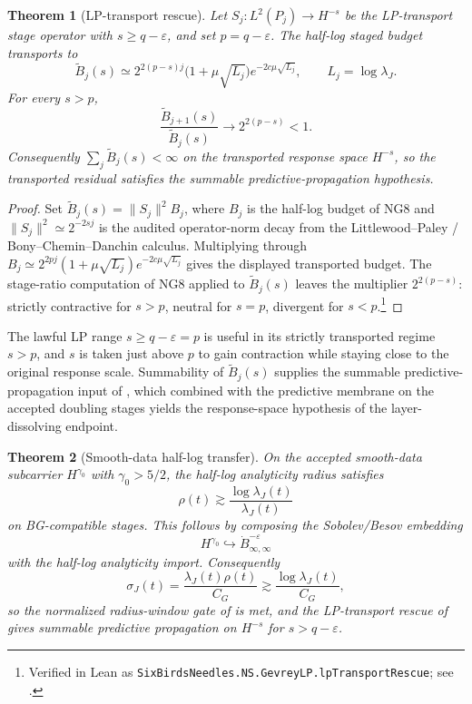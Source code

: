 \documentclass[11pt]{article}
\newcommand{\eps}{\varepsilon}
\newcommand{\CG}{C_G}
\newcommand{\sigmaJ}{\sigma_J}
\newcommand{\lambdaJ}{\lambda_J}
\newcommand{\LPtr}{S_j}
\newtheorem{theorem}{Theorem}[section]
\theoremstyle{definition}
\begin{document}
\begin{theorem}[LP-transport rescue]\label{thm:ns:lp-transport-rescue}
Let \(\LPtr:L^2(P_j)\to H^{-s}\) be the LP-transport stage operator with
\(s\ge q-\eps\), and set \(p=q-\eps\).  The half-log staged budget
transports to
\[
  \widetilde B_j(s)
  \simeq
  2^{2(p-s)j}
  \bigl(1+\mu\sqrt{L_j}\bigr)
  e^{-2c\mu\sqrt{L_j}},
  \qquad
  L_j=\log\lambdaJ .
\]
For every \(s>p\),
\[
  \frac{\widetilde B_{j+1}(s)}{\widetilde B_j(s)}
  \longrightarrow
  2^{2(p-s)}<1 .
\]
Consequently \(\sum_j \widetilde B_j(s)<\infty\) on the transported
response space \(H^{-s}\), so the transported residual satisfies the
summable predictive-propagation hypothesis.
\end{theorem}

\begin{proof}
Set \(\widetilde B_j(s)=\|\LPtr\|^2 B_j\), where \(B_j\) is the
half-log budget of NG8 and \(\|\LPtr\|^2\simeq 2^{-2sj}\) is the
audited operator-norm decay from the Littlewood--Paley /
Bony--Chemin--Danchin calculus.  Multiplying through
\(B_j\simeq 2^{2pj}(1+\mu\sqrt{L_j})e^{-2c\mu\sqrt{L_j}}\) gives the
displayed transported budget.  The stage-ratio computation of NG8
applied to \(\widetilde B_j(s)\) leaves the multiplier
\(2^{2(p-s)}\): strictly contractive for \(s>p\), neutral for
\(s=p\), divergent for \(s<p\).\footnote{Verified in Lean as \texttt{SixBirdsNeedles.NS.GevreyLP.lpTransportRescue}; see .}
\end{proof}

\noindent
The lawful LP range \(s\ge q-\eps=p\) is useful in its strictly
transported regime \(s>p\), and \(s\) is taken just above \(p\) to
gain contraction while staying close to the original response scale.
Summability of \(\widetilde B_j(s)\) supplies the summable
predictive-propagation input of \citet{Tsiokos2026NeedleKiller}, which
combined with the predictive membrane on the accepted doubling stages
yields the response-space hypothesis of the layer-dissolving endpoint.

\begin{theorem}[Smooth-data half-log transfer]
\label{thm:ns:smooth-data-half-log-transfer}
On the accepted smooth-data subcarrier \(H^{\gamma_0}\) with
\(\gamma_0>5/2\), the half-log analyticity radius satisfies
\[
  \rho(t)\gtrsim \frac{\log\lambdaJ(t)}{\lambdaJ(t)}
\]
on BG-compatible stages.  This follows by composing the Sobolev/Besov
embedding
\[
  H^{\gamma_0}\hookrightarrow
  \dot B^{-\eps}_{\infty,\infty}
\]
with the half-log analyticity import.  Consequently
\[
  \sigmaJ(t)
  =
  \frac{\lambdaJ(t)\rho(t)}{\CG}
  \gtrsim
  \frac{\log\lambdaJ(t)}{\CG},
\]
so the normalized radius-window gate of
 is met, and the LP-transport rescue of
 gives summable predictive propagation
on \(H^{-s}\) for \(s>q-\eps\).
\end{theorem}
\end{document}
